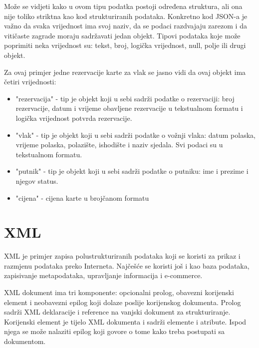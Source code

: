 \documentclass{foi}
\begin{document}
Može se vidjeti kako u ovom tipu podatka postoji određena struktura, ali ona nije toliko striktna kao kod strukturiranih podataka. Konkretno kod JSON-a je važno da svaka vrijednost ima svoj naziv, da se podaci razdvajaju zarezom i da vitičaste zagrade moraju sadržavati jedan objekt. Tipovi podataka koje može poprimiti neka vrijednost su: tekst, broj, logička vrijednost, null,  polje ili drugi objekt. 

Za ovaj primjer jedne rezervacije karte za vlak se jasno vidi da ovaj objekt ima četiri vrijednosti:

\begin{itemize}
\item "rezervacija" - tip je objekt koji u sebi sadrži podatke o rezervaciji: broj rezervacije, datum i vrijeme obavljene rezervacije u tekstualnom formatu i logička vrijednost potvrda rezervacije.
\item "vlak" - tip je objekt koji u sebi sadrži podatke o vožnji vlaka: datum polaska, vrijeme polaska, polazište, ishodište i naziv sjedala. Svi podaci su u tekstualnom formatu.
\item "putnik" - tip je objekt koji u sebi sadrži podatke o putniku: ime i prezime i njegov status.
\item "cijena" -  cijena karte u brojčanom formatu
\end{itemize}

\chapter{XML}

XML je primjer zapisa polustrukturiranih podataka koji se koristi za prikaz i razmjenu podataka preko Interneta. Najčešće se koristi još i kao baza podataka, zapisivanje metapodataka, upravljanje informacija i e-commerce. 

XML dokument ima tri komponente: opcionalni prolog, obavezni korijenski element i neobavezni epilog koji dolaze poslije korijenskog dokumenta. Prolog sadrži XML deklaracije i reference na vanjski dokument za strukturiranje. Korijenski element je tijelo XML dokumenta i sadrži elemente i atribute. Ispod njega se može nalaziti epilog koji govore o tome kako treba postupati sa dokumentom. \cite{xmlDatabase}
\end{document}
